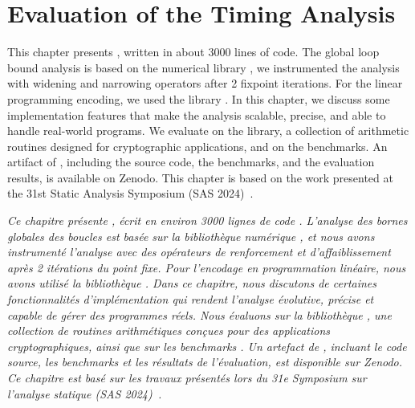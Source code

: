\setchapterpreamble[u]{\margintoc}

\chapter{Evaluation of the Timing Analysis}

\marginemptybox{2.4cm}

This chapter presents \timesec\sidenote{\label{ss69}\timesecurl}, written in about 3000 lines of \python{} code.
The global loop bound analysis is based on the numerical library \apron{} , we instrumented the analysis with widening and narrowing operators after 2 fixpoint iterations.
For the linear programming encoding, we used the \python{} library \scipy{}.
In this chapter, we discuss some implementation features that make the analysis scalable, precise, and able to handle real-world programs.
We evaluate \timesec{} on the \bignum{} library\sidenote{\bignumurl}, a collection of arithmetic routines designed for cryptographic applications, and on the \svcomp{} benchmarks\sidenote{\label{ss69420}\svcompurl}.
An artifact of \timesec, including the source code, the benchmarks, and the evaluation results, is available on Zenodo\sidenote{\label{ss42069}\timeseczenodo}.
This chapter is based on the work presented at the 31st Static Analysis Symposium (SAS 2024)~.


\frenchdiv

\emph{Ce chapitre présente \timesec\sidenotemark[\ref{ss69}], écrit en environ 3000 lignes de code \python{}. L'analyse des bornes globales des boucles est basée sur la bibliothèque numérique \apron{} \cite{Jeannet2009}, et nous avons instrumenté l'analyse avec des opérateurs de renforcement et d'affaiblissement après 2 itérations du point fixe. Pour l'encodage en programmation linéaire, nous avons utilisé la bibliothèque \python{} \scipy\sidenotemark[\ref{ss420}]. Dans ce chapitre, nous discutons de certaines fonctionnalités d'implémentation qui rendent l'analyse évolutive, précise et capable de gérer des programmes réels. Nous évaluons \timesec{} sur la bibliothèque \bignum{} \sidenotemark[\ref{ss69420}], une collection de routines arithmétiques conçues pour des applications cryptographiques, ainsi que sur les benchmarks \svcomp{} \sidenotemark[\ref{ss420}]. Un artefact de \timesec, incluant le code source, les benchmarks et les résultats de l'évaluation, est disponible sur Zenodo\sidenotemark[\ref{ss42069}]. Ce chapitre est basé sur les travaux présentés lors du 31e Symposium sur l'analyse statique (SAS 2024)~\cite{Mazzucato2024c}.}





